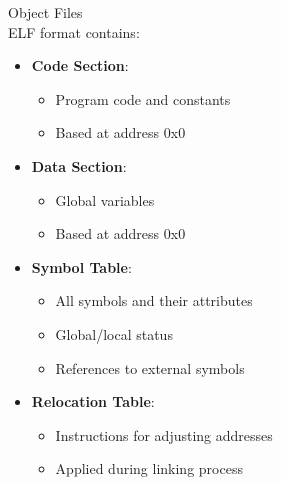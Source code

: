 \begin{definition}{Object Files}\\
ELF format contains:
\begin{itemize}
  \item \textbf{Code Section}:
    \begin{itemize}
      \item Program code and constants
      \item Based at address 0x0
    \end{itemize}
  \item \textbf{Data Section}:
    \begin{itemize}
      \item Global variables
      \item Based at address 0x0
    \end{itemize}
  \item \textbf{Symbol Table}:
    \begin{itemize}
      \item All symbols and their attributes
      \item Global/local status
      \item References to external symbols
    \end{itemize}
  \item \textbf{Relocation Table}:
    \begin{itemize}
      \item Instructions for adjusting addresses
      \item Applied during linking process
    \end{itemize}
\end{itemize}
\end{definition}

